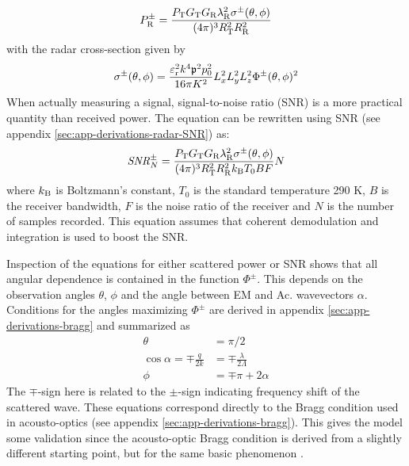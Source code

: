 \documentclass[11pt,twoside]{eitExjobb}
\begin{document}
	\begin{equation*}
		P_{\mathrm{R}}^\pm = \frac{P_{\mathrm{T}} G_{\mathrm{T}} G_{\mathrm{R}} \lambda_{\mathrm{R}}^2 \sigma^\pm (\theta,\phi)}{(4\pi)^3 R_{\mathrm{T}}^2 R_{\mathrm{R}}^2}
	\end{equation*}
	with the radar cross-section given by
	\begin{equation*}
		\sigma^\pm (\theta, \phi) = \frac{\varepsilon_{\mathrm{r}}^2 k^4 \mathfrak{p}^2 p_0^2}{16\pi K^2} L_{x}^2 L_{y}^2 L_{z}^2 \Phi^\pm (\theta,\phi)^2
	\end{equation*}
	When actually measuring a signal, signal-to-noise ratio (SNR) is a more practical quantity than received power. The equation can be rewritten using SNR (see appendix \ref{sec:app-derivations-radar-SNR}) as:
	\begin{equation*}
		\mathit{SNR}^\pm_N = \frac{P_{\mathrm{T}} G_{\mathrm{T}} G_{\mathrm{R}} \lambda_{\mathrm{R}}^2 \sigma^\pm (\theta,\phi)}{(4\pi)^3 R_{\mathrm{T}}^2 R_{\mathrm{R}}^2 k_{\mathrm{B}} T_0 B F} N
	\end{equation*}
	where $k_{\mathrm{B}}$ is Boltzmann's constant, $T_0$ is the standard temperature 290 K, $B$ is the receiver bandwidth, $F$ is the noise ratio of the receiver and $N$ is the number of samples recorded. This equation assumes that coherent demodulation and integration is used to boost the SNR.
	
	Inspection of the equations for either scattered power or SNR shows that all angular dependence is contained in the function $\Phi^\pm$. This depends on the observation angles $\theta$, $\phi$ and the angle between EM and Ac. wavevectors $\alpha$. Conditions for the angles maximizing $\Phi^\pm$ are derived in appendix \ref{sec:app-derivations-bragg} and summarized as
	\begin{align}
		\theta &= \pi/2 \label{eq:an-bragg-theta} \\
		\cos{\alpha} = \mp \frac{q}{2k} &= \mp \frac{\lambda}{2\Lambda} \label{eq:an-bragg-alpha} \\
		\phi &= \mp \pi + 2\alpha \label{eq:an-bragg-phi}
	\end{align}
	The $\mp$-sign here is related to the $\pm$-sign indicating frequency shift of the scattered wave. These equations correspond directly to the Bragg condition used in acousto-optics (see appendix \ref{sec:app-derivations-bragg}). This gives the model some validation since the acousto-optic Bragg condition is derived from a slightly different starting point, but for the same basic phenomenon \cite{Saleh2007}.
	
	
\end{document}
